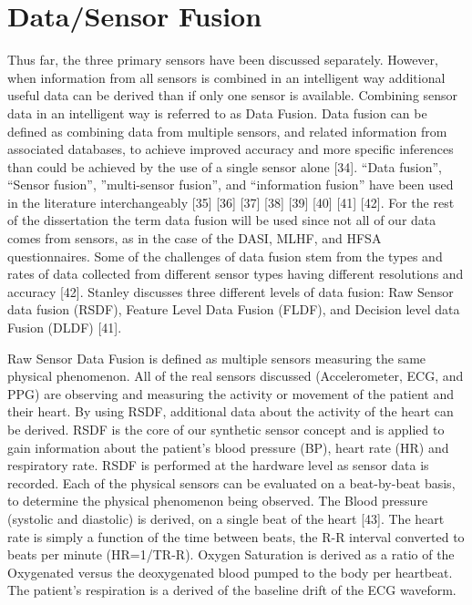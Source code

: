 \section{Data/Sensor Fusion}
Thus far, the three primary sensors have been discussed separately. However, when information from all sensors is combined in an intelligent way additional useful data can be derived than if only one sensor is available.  Combining sensor data in an intelligent way is referred to as Data Fusion. Data fusion can be defined as combining data from multiple sensors, and related information from associated databases, to achieve improved accuracy and more specific inferences than could be achieved by the use of a single sensor alone [34].  “Data fusion”, “Sensor fusion”,  ”multi-sensor fusion”, and “information fusion” have been used in the literature interchangeably [35] [36] [37] [38] [39] [40] [41] [42]. For the rest of the dissertation the term data fusion will be used since not all of our data comes from sensors, as in the case of the DASI, MLHF, and HFSA questionnaires.  Some of the challenges of data fusion stem from the types and rates of data collected from different sensor types having different resolutions and accuracy [42].  Stanley discusses three different levels of data fusion: Raw Sensor data fusion (RSDF), Feature Level Data Fusion (FLDF), and Decision level data Fusion (DLDF) [41].  

Raw Sensor Data Fusion is defined as multiple sensors measuring the same physical phenomenon. All of the real sensors discussed (Accelerometer, ECG, and PPG) are observing and measuring the activity or movement of the patient and their heart. By using RSDF, additional data about the activity of the heart can be derived. RSDF is the core of our synthetic sensor concept and is applied to gain information about the patient’s blood pressure (BP), heart rate (HR) and respiratory rate. RSDF is performed at the hardware level as sensor data is recorded. Each of the physical sensors can be evaluated on a beat-by-beat basis, to determine the physical phenomenon being observed. The Blood pressure (systolic and diastolic) is derived, on a single beat of the heart [43]. The heart rate is simply a function of the time between beats, the R-R interval converted to beats per minute (HR=1/TR-R). Oxygen Saturation is derived as a ratio of the Oxygenated versus the deoxygenated blood pumped to the body per heartbeat. The patient’s respiration is a derived of the baseline drift of the ECG waveform. 

